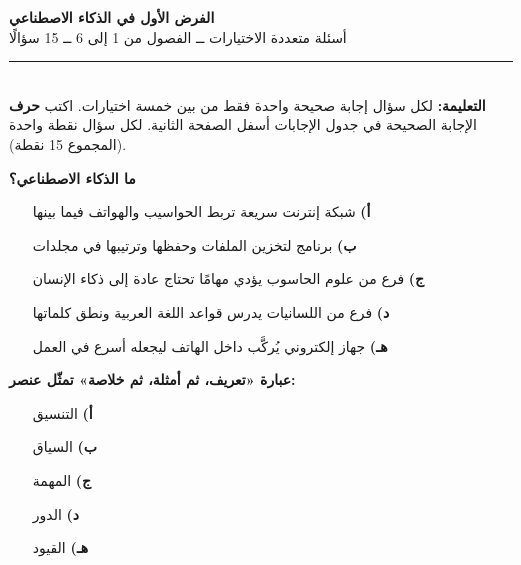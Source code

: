 \documentclass[11pt,a4paper]{article}
\begin{document}
\begin{center}
{\Large\khatt\textbf{الفرض الأول في الذكاء الاصطناعي}}\\[2pt]
{\normalsize أسئلة متعددة الاختيارات ــ الفصول من 1 إلى 6 ــ 15 سؤالًا}
\end{center}
\vspace{-4pt}\rule{\textwidth}{0.6pt}\\
{\small\textbf{التعليمة:} لكل سؤال إجابة صحيحة واحدة فقط من بين خمسة اختيارات.
اكتب \textbf{حرف} الإجابة الصحيحة في جدول الإجابات أسفل الصفحة الثانية.
لكل سؤال نقطة واحدة (المجموع 15 نقطة).}
\vspace{-2pt}
\begin{multicols}{2}

\noindent\begin{minipage}{\linewidth}
\hangindent=0.7cm\textbf{ما الذكاء الاصطناعي؟}
\begin{itemize}[leftmargin=0.95cm, labelsep=4pt, itemsep=0pt, topsep=2pt, parsep=0pt]
  \item[\textbf{أ)}] شبكة إنترنت سريعة تربط الحواسيب والهواتف فيما بينها
  \item[\textbf{ب)}] برنامج لتخزين الملفات وحفظها وترتيبها في مجلدات
  \item[\textbf{ج)}] فرع من علوم الحاسوب يؤدي مهامًا تحتاج عادة إلى ذكاء الإنسان
  \item[\textbf{د)}] فرع من اللسانيات يدرس قواعد اللغة العربية ونطق كلماتها
  \item[\textbf{هـ)}] جهاز إلكتروني يُركَّب داخل الهاتف ليجعله أسرع في العمل
\end{itemize}
\end{minipage}\par\vspace{7pt plus 4pt}
\noindent\begin{minipage}{\linewidth}
\hangindent=0.7cm\textbf{عبارة «تعريف، ثم أمثلة، ثم خلاصة» تمثّل عنصر:}
\begin{itemize}[leftmargin=0.95cm, labelsep=4pt, itemsep=0pt, topsep=2pt, parsep=0pt]
  \item[\textbf{أ)}] التنسيق
  \item[\textbf{ب)}] السياق
  \item[\textbf{ج)}] المهمة
  \item[\textbf{د)}] الدور
  \item[\textbf{هـ)}] القيود
\end{itemize}
\end{minipage}\par\vspace{7pt plus 4pt}

\end{multicols}
\end{document}
